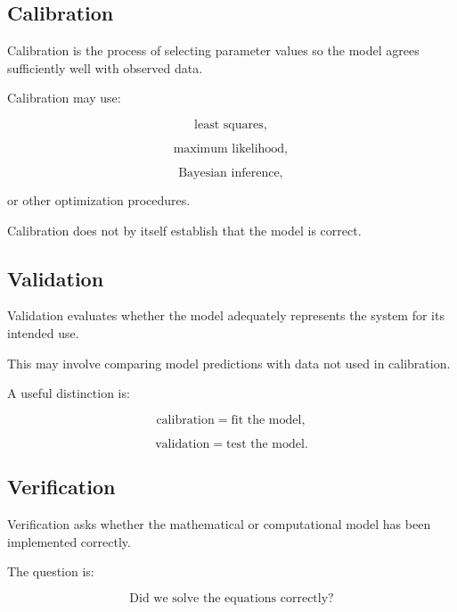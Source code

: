 \subsection{Calibration}
\label{subsec:model-calibration}

Calibration is the process of selecting parameter values so the model
agrees sufficiently well with observed data.

Calibration may use:

\[
\boxed{
\text{least squares},
}
\]

\[
\boxed{
\text{maximum likelihood},
}
\]

\[
\boxed{
\text{Bayesian inference},
}
\]

or other optimization procedures.

Calibration does not by itself establish that the model is correct.

\subsection{Validation}
\label{subsec:model-validation}

Validation evaluates whether the model adequately represents the system for
its intended use.

This may involve comparing model predictions with data not used in
calibration.

A useful distinction is:

\[
\boxed{
\text{calibration}
=
\text{fit the model},
}
\]

\[
\boxed{
\text{validation}
=
\text{test the model}.
}
\]

\subsection{Verification}
\label{subsec:model-verification}

Verification asks whether the mathematical or computational model has been
implemented correctly.

The question is:

\[
\boxed{
\text{Did we solve the equations correctly?}
}
\]

